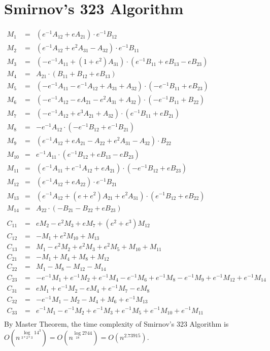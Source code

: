 \documentclass{article}
\begin{document}
\section{Smirnov's 323 Algorithm}

\begin{eqnarray*}
M_1 &=& (e^{-1}A_{12} + eA_{21}) \cdot e^{-1}B_{12}\\
M_2 &=& (e^{-1}A_{12} + e^2A_{31} - A_{32}) \cdot e^{-1}B_{11}\\
M_3 &=& (-e^{-1}A_{11} + (1+e^2)A_{31}) \cdot (e^{-1}B_{11} + eB_{13} - eB_{23})\\
M_4 &=& A_{21} \cdot (B_{11} + B_{12} + eB_{13})\\
M_5 &=& (-e^{-1}A_{11} - e^{-1}A_{12} + A_{31} + A_{32}) \cdot (-e^{-1}B_{11} + eB_{23})\\
M_6 &=& (-e^{-1}A_{12} - eA_{21} - e^2A_{31} + A_{32}) \cdot (-e^{-1}B_{11} + B_{22})\\
M_7 &=& (-e^{-1}A_{12} + e^3A_{21} + A_{32}) \cdot (e^{-1}B_{11} + eB_{21})\\
M_8 &=& -e^{-1}A_{12} \cdot (-e^{-1}B_{12} + e^{-1}B_{21})\\
M_9 &=& (e^{-1}A_{12} + eA_{21} - A_{22} + e^2A_{31} - A_{32}) \cdot B_{22}\\
M_{10} &=& e^{-1}A_{11} \cdot (e^{-1}B_{12} + eB_{13} - eB_{23})\\
M_{11} &=& (e^{-1}A_{11} + e^{-1}A_{12} + eA_{21}) \cdot (-e^{-1}B_{12} + eB_{23})\\
M_{12} &=& (e^{-1}A_{12} + eA_{22}) \cdot e^{-1}B_{21}\\
M_{13} &=& (e^{-1}A_{12} + (e+e^2)A_{21} + e^2A_{31}) \cdot (e^{-1}B_{12} + eB_{22})\\
M_{14} &=& A_{22} \cdot (-B_{21} - B_{22} + eB_{23})\\\\
C_{11} &=& eM_2 - e^2M_3 + eM_7 + (e^2+e^3)M_{12}\\
C_{12} &=& -M_1 + e^2M_{10} + M_{13}\\
C_{13} &=& M_1 - e^2M_2 + e^2M_3 + e^2M_5 + M_{10} + M_{11}\\
C_{21} &=& -M_1 + M_4 + M_8 + M_{12}\\
C_{22} &=& M_1 - M_8 - M_{12} - M_{14}\\
C_{23} &=& -e^{-1}M_1 + e^{-1}M_2 + e^{-1}M_4 - e^{-1}M_6 + e^{-1}M_8 - e^{-1}M_9 + e^{-1}M_{12} + e^{-1}M_{14}\\
C_{31} &=& eM_1 + e^{-1}M_2 - eM_4 + e^{-1}M_7 - eM_8\\
C_{32} &=& -e^{-1}M_1 - M_2 - M_4 + M_6 + e^{-1}M_{13}\\
C_{33} &=& e^{-1}M_1 - e^{-1}M_2 + e^{-1}M_3 + e^{-1}M_5 + e^{-1}M_{10} + e^{-1}M_{11}\\
\end{eqnarray*}
By Master Theorem, the time complexity of Smirnov's 323 Algorithm is $O(n^{\log\limits_{3*2*3}14^3}) = O(n^{\log\limits_{18}2744}) = O(n^{2.73915})$.
\end{document}
